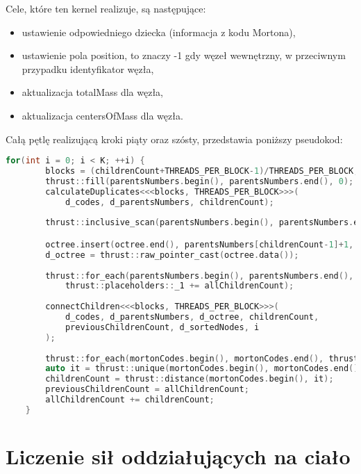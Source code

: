 \documentclass[14pt,twoside,a4paper]{article}
\theoremstyle{definition}
\begin{document}
Cele, które ten kernel realizuje, są następujące:
\begin{itemize}
\item ustawienie odpowiedniego dziecka (informacja z kodu Mortona),
\item ustawienie pola position, to znaczy -1 gdy węzeł wewnętrzny, w przeciwnym przypadku identyfikator węzła,
\item aktualizacja totalMass dla węzła,
\item aktualizacja centersOfMass dla węzła. 
\end{itemize}

Całą pętlę realizującą kroki piąty oraz szósty, przedstawia poniższy pseudokod:
\newpage
{}              
\begin{lstlisting}[language=C++, frame=single, framerule=2pt, caption=Kroki 5-6]
for(int i = 0; i < K; ++i) {
        blocks = (childrenCount+THREADS_PER_BLOCK-1)/THREADS_PER_BLOCK;
        thrust::fill(parentsNumbers.begin(), parentsNumbers.end(), 0);
        calculateDuplicates<<<blocks, THREADS_PER_BLOCK>>>(
            d_codes, d_parentsNumbers, childrenCount);
        
        thrust::inclusive_scan(parentsNumbers.begin(), parentsNumbers.end(), parentsNumbers.begin());

        octree.insert(octree.end(), parentsNumbers[childrenCount-1]+1, OctreeNode());
        d_octree = thrust::raw_pointer_cast(octree.data()); 
        
        thrust::for_each(parentsNumbers.begin(), parentsNumbers.end(), 
        	thrust::placeholders::_1 += allChildrenCount);
        
        connectChildren<<<blocks, THREADS_PER_BLOCK>>>(
            d_codes, d_parentsNumbers, d_octree, childrenCount, 
            previousChildrenCount, d_sortedNodes, i
        );
        
        thrust::for_each(mortonCodes.begin(), mortonCodes.end(), thrust::placeholders::_1 >>= 3);
        auto it = thrust::unique(mortonCodes.begin(), mortonCodes.end());
        childrenCount = thrust::distance(mortonCodes.begin(), it);
        previousChildrenCount = allChildrenCount;
        allChildrenCount += childrenCount;
    }
\end{lstlisting}

\section{\LARGE Liczenie sił oddziałujących na ciało}
\end{document}
